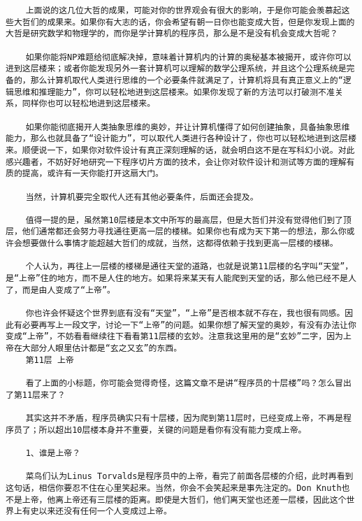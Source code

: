 \begin{verbatim}
    上面说的这几位大哲的成果，可能对你的世界观会有很大的影响，于是你可能会羡慕起这些大哲们的成果来。如果你有大志的话，你会希望有朝一日你也能变成大哲，但是你发现上面的大哲是研究数学和物理学的，而你是学计算机的程序员，那么是不是没有机会变成大哲呢？

    如果你能将NP难题给彻底解决掉，意味着计算机内的计算的奥秘基本被揭开，或许你可以进到这层楼来；或者你能发现另外一套计算机可以理解的数学公理系统，并且这个公理系统是完备的，那么计算机取代人类进行思维的一个必要条件就满足了，计算机将具有真正意义上的“逻辑思维和推理能力”，你可以轻松地进到这层楼来。如果你发现了新的方法可以打破测不准关系，同样你也可以轻松地进到这层楼来。

    如果你能彻底揭开人类抽象思维的奥妙，并让计算机懂得了如何创建抽象，具备抽象思维能力，那么也就具备了“设计能力”，可以取代人类进行各种设计了，你也可以轻松地进到这层楼来。顺便说一下，如果你对软件设计有真正深刻理解的话，就会明白这不是在写科幻小说。对此感兴趣者，不妨好好地研究一下程序切片方面的技术，会让你对软件设计和测试等方面的理解有质的提高，或许有一天你能打开这扇大门。

    当然，计算机要完全取代人还有其他必要条件，后面还会提及。

    值得一提的是，虽然第10层楼是本文中所写的最高层，但是大哲们并没有觉得他们到了顶层，他们通常都还会努力寻找通往更高一层的楼梯。如果你也有成为天下第一的想法，那么你或许会想要做什么事情才能超越大哲们的成就，当然，这都得依赖于找到更高一层楼的楼梯。

    个人认为，再往上一层楼的楼梯是通往天堂的道路，也就是说第11层楼的名字叫“天堂”，是“上帝”住的地方，而不是人住的地方。如果将来某天有人能爬到天堂的话，那么他已经不是人了，而是由人变成了“上帝”。

    你也许会怀疑这个世界到底有没有“天堂”，“上帝”是否根本就不存在，我也很有同感。因此有必要再写上一段文字，讨论一下“上帝”的问题。如果你想了解天堂的奥妙，有没有办法让你变成“上帝”，不妨看看继续往下看看第11层楼的玄妙。注意我这里用的是“玄妙”二字，因为上帝在大部分人眼里估计都是“玄之又玄”的东西。
    第11层 上帝

    看了上面的小标题，你可能会觉得奇怪，这篇文章不是讲“程序员的十层楼”吗？怎么冒出了第11层来了？

    其实这并不矛盾，程序员确实只有十层楼，因为爬到第11层时，已经变成上帝，不再是程序员了；所以超出10层楼本身并不重要，关键的问题是看你有没有能力变成上帝。

    1、谁是上帝？

    菜鸟们认为Linus Torvalds是程序员中的上帝，看完了前面各层楼的介绍，此时再看到这句话，相信你要忍不住在心里笑起来。当然，你会不会笑起来是事先注定的。Don Knuth也不是上帝，他离上帝还有三层楼的距离。即使是大哲们，他们离天堂也还差一层楼，因此这个世界上有史以来还没有任何一个人变成过上帝。


\end{verbatim}
